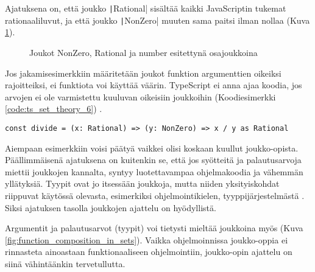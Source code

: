 Ajatuksena on, että joukko \texttt|Rational| sisältää kaikki JavaScriptin tukemat rationaaliluvut, ja että joukko \texttt|NonZero| muuten sama paitsi ilman nollaa (Kuva \ref{fig:set-esimerkki}).



\begin{figure}[ht]
    \centering
    \caption{Joukot NonZero, Rational ja number esitettynä osajoukkoina}
    \label{fig:set-esimerkki}
\end{figure}


Jos jakamisesimerkkiin määritetään joukot funktion argumenttien oikeiksi rajoitteiksi, ei funktiota voi käyttää väärin. TypeScript ei anna ajaa koodia, jos arvojen ei ole varmistettu kuuluvan oikeisiin joukkoihin (Koodiesimerkki \ref{code:ts_set_theory_6}) \cite{typsecript_website}.

\begin{code}
    \begin{verbatim}
const divide = (x: Rational) => (y: NonZero) => x / y as Rational
\end{verbatim}
    \caption{Korrekti versio. Funktiolle annettavat arvot on varmistettava kuuluvan oikeisiin joukkoihin jossain vaiheessa ennen funktioon syöttöä käyttäen määriteltyjä \texttt|isRational| ja \texttt|isNonZero| funktioita }
    \label{code:ts_set_theory_6}
\end{code}

Aiempaan esimerkkiin voisi päätyä vaikkei olisi koskaan kuullut joukko-opista. Päällimmäisenä ajatuksena on kuitenkin se, että jos syötteitä ja palautusarvoja miettii joukkojen kannalta, syntyy luotettavampaa ohjelmakoodia ja vähemmän yllätyksiä. Tyypit ovat jo itsessään joukkoja, mutta niiden yksityiskohdat riippuvat käytössä olevasta, esimerkiksi ohjelmointikielen, tyyppijärjestelmästä \cite{type_theory}. Siksi ajatuksen tasolla joukkojen ajattelu on hyödyllistä.

Argumentit ja palautusarvot (tyypit) voi tietysti mieltää joukkoina myös  (Kuva \ref{fig:function_composition_in_sets}). Vaikka ohjelmoinnissa joukko-oppia ei rinnasteta ainoastaan funktionaaliseen ohjelmointiin,  joukko-opin ajattelu on siinä vähintäänkin tervetullutta.

